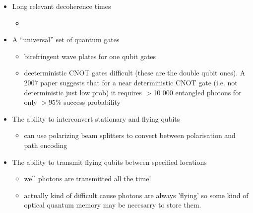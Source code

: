 \begin{itemize}
\begin{itemize}
    \end{itemize}
    
    \item Long relevant decoherence times
    \begin{itemize}
        \item 
    \end{itemize}

    \item A ``universal'' set of quantum gates
    \begin{itemize}
        \item birefringent wave plates for one qubit gates \cite{obrien_optical_2007}
    
        \item deeterministic CNOT gates difficult (these are the double qubit ones). A 2007 paper suggests that for a near deterministic CNOT gate (i.e. not deterministic just low prob) it requires $>$10 000 entangled photons for only $>95\%$ success probability \cite{obrien_optical_2007}
    \end{itemize}

    \item The ability to interconvert stationary and flying qubits
    \begin{itemize}
        \item can use polarizing beam splitters to convert between polarisation and path encoding \cite{obrien_optical_2007}
    \end{itemize}

    \item The ability to transmit flying qubits between specified locations
    \begin{itemize}
        \item well photons are transmitted all the time!
        \item actually kind of difficult cause photons are always 'flying' so some kind of optical quantum memory may be necesarry to store them. 
    \end{itemize}
\end{itemize}
